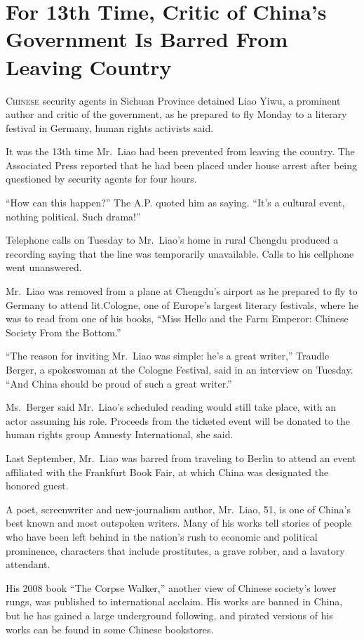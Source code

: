 ﻿\documentclass[12pt]{article}
\begin{document}
\section{For 13th Time, Critic of China's Government Is Barred From Leaving Country}

\lettrine{C}{hinese} security agents in Sichuan Province detained Liao Yiwu,
a prominent author and critic of the government, as he prepared to fly Monday to a literary festival
in Germany, human rights activists said.

It was the 13th time Mr.~Liao had been prevented from leaving the country. The Associated Press
reported that he had been placed under house arrest after being questioned by security agents for
four hours.

``How can this happen?'' The A.P. quoted him as saying. ``It's a cultural event, nothing political.
Such drama!''

Telephone calls on Tuesday to Mr.~Liao's home in rural Chengdu produced a recording saying that the
line was temporarily unavailable. Calls to his cellphone went unanswered.

Mr.~Liao was removed from a plane at Chengdu's airport as he prepared to fly to Germany to attend
lit.Cologne, one of Europe's largest literary festivals, where he was to read from one of his books,
``Miss Hello and the Farm Emperor: Chinese Society From the Bottom.''

``The reason for inviting Mr.~Liao was simple: he's a great writer,'' Traudle Berger, a spokeswoman
at the Cologne Festival, said in an interview on Tuesday. ``And China should be proud of such a
great writer.''

Ms.~Berger said Mr.~Liao's scheduled reading would still take place, with an actor assuming his
role. Proceeds from the ticketed event will be donated to the human rights group Amnesty
International, she said.

Last September, Mr.~Liao was barred from traveling to Berlin to attend an event affiliated with the
Frankfurt Book Fair, at which China was designated the honored guest.

A poet, screenwriter and new-journalism author, Mr.~Liao, 51, is one of China's best known and most
outspoken writers. Many of his works tell stories of people who have been left behind in the
nation's rush to economic and political prominence, characters that include prostitutes, a grave
robber, and a lavatory attendant.

His 2008 book ``The Corpse Walker,'' another view of Chinese society's lower rungs, was published to
international acclaim. His works are banned in China, but he has gained a large underground
following, and pirated versions of his works can be found in some Chinese bookstores.
\end{document}
